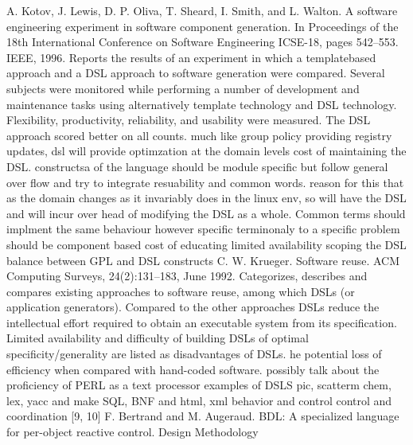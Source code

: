 A. Kotov, J. Lewis, D. P. Oliva, T. Sheard, I. Smith,
and L. Walton. A software engineering experiment in
software component generation. In Proceedings of the
18th International Conference on Software Engineering
ICSE-18, pages 542–553. IEEE, 1996.
Reports the results of an experiment in which a templatebased
approach and a DSL approach to software generation
were compared. Several subjects were monitored
while performing a number of development and maintenance
tasks using alternatively template technology and
DSL technology. Flexibility, productivity, reliability, and
usability were measured. The DSL approach scored better
on all counts.
\newline
much like group policy providing registry updates, dsl will provide optimzation at the domain levels
\newline
cost of maintaining the DSL. constructsa of the language should be module specific but follow general over flow and try to integrate resuability and common words.
\newline
reason for this that as the domain changes as it invariably does in the linux env, so will have the DSL and will incur over head of modifying the DSL as a whole.  Common terms should implment the same behaviour however specific terminonaly to a specific problem should be component based
\newline
cost of educating 
\newline
limited availability
\newline
scoping the DSL
\newline
balance between GPL and DSL  constructs
\newline
C. W. Krueger. Software reuse. ACM Computing Surveys,
24(2):131–183, June 1992.
\newline
Categorizes, describes and compares existing approaches
to software reuse, among which DSLs (or
application generators). Compared to the other approaches
DSLs reduce the intellectual effort required to
obtain an executable system from its specification. Limited
availability and difficulty of building DSLs of optimal
specificity/generality are listed as disadvantages of
DSLs.
\newlineT
he potential loss of efficiency when compared with
hand-coded software.
\newline
possibly talk about the proficiency of PERL as a text processor
\newline
examples of DSLS
\newline
pic, scatterm chem, lex, yacc and make 
SQL, BNF and html, xml
\newline
behavior and control
control and coordination [9, 10]
F. Bertrand and M. Augeraud. BDL: A specialized language
for per-object reactive control.
\newline
Design Methodology

